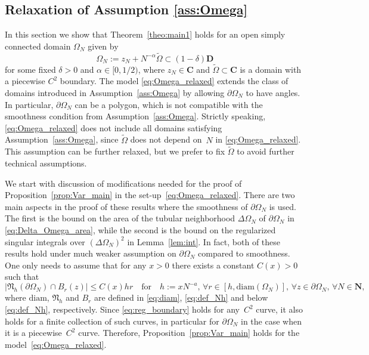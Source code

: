 \documentclass[10pt]{amsart}
\numberwithin{equation}{section}
\newcommand{\C}{\mathbf{C}}
\newcommand{\N}{\mathbf{N}}
\begin{document}
\subsection{Relaxation of Assumption \ref{ass:Omega}}\label{app:Omega} In this section we show that Theorem~\ref{theo:main1} holds for an open simply connected domain $\Omega_N$ given by
\begin{equation}
\Omega_N:=z_N + N^{-\alpha}\widetilde{\Omega}\subset (1-\delta)\mathbf{D}
\label{eq:Omega_relaxed}
\end{equation}
for some fixed $\delta>0$ and $\alpha\in [0,1/2)$, where $z_N\in \C$ and $\widetilde{\Omega}\subset \C$ is a domain with a piecewise $C^2$ boundary. The model \eqref{eq:Omega_relaxed} extends the class of domains introduced in Assumption~\ref{ass:Omega} by allowing $\partial\Omega_N$ to have angles. In particular, $\partial\Omega_N$ can be a polygon, which is not compatible with the smoothness condition from Assumption~\ref{ass:Omega}. Strictly speaking, \eqref{eq:Omega_relaxed} does not include all domains satisfying Assumption~\ref{ass:Omega}, since $\widetilde{\Omega}$ does not depend on~$N$ in \eqref{eq:Omega_relaxed}. This assumption can be further relaxed, but we prefer to fix $\widetilde{\Omega}$ to avoid further technical assumptions.

We start with discussion of modifications needed for the proof of Proposition~\ref{prop:Var_main} in the set-up~\eqref{eq:Omega_relaxed}. There are two main aspects in the proof of these results where the smoothness of $\partial\Omega_N$ is used. The first is the bound on the area of the tubular neighborhood $\Delta\Omega_N$ of $\partial\Omega_N$ in \eqref{eq:Delta_Omega_area}, while the second is the bound on the regularized singular integrals over $(\Delta\Omega_N)^2$ in Lemma~\ref{lem:int}. In fact, both of these results hold under much weaker assumption on $\partial\Omega_N$ compared to smoothness. One only needs to assume that for any $x>0$ there exists a constant $C(x)>0$ such that
\begin{equation}
\left\vert \mathfrak{N}_h(\partial\Omega_N)\cap B_r(z)\right\vert \le C(x)hr\quad \text{for}\quad h:=xN^{-a},\, \forall r\in [h, \mathrm{diam}(\Omega_N)],\, \forall z\in \partial\Omega_N,\, \forall N\in\N,
\label{eq:reg_boundary}
\end{equation} 
where $\mathrm{diam}$, $\mathfrak{N}_h$ and $B_r$ are defined in \eqref{eq:diam}, \eqref{eq:def_Nh} and below \eqref{eq:def_Nh}, respectively. Since \eqref{eq:reg_boundary} holds for any~$C^2$ curve, it also holds for a finite collection of such curves, in particular for $\partial \Omega_N$ in the case when it is a piecewise~$C^2$ curve. Therefore, Proposition~\ref{prop:Var_main} holds for the model~\eqref{eq:Omega_relaxed}.
\end{document}
